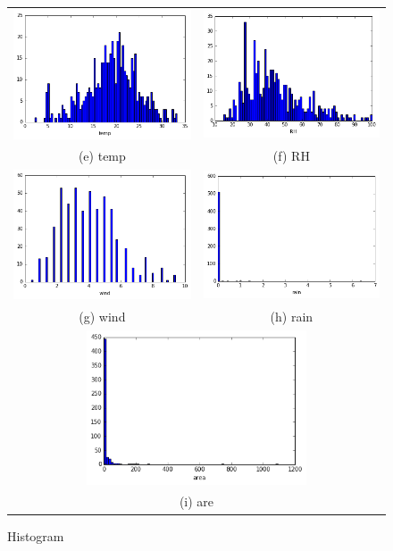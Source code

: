 \newpage

\begin{figure}
\begin{tabular}{cc}
  \includegraphics[width=65mm]{images/hist/temp.png} &   \includegraphics[width=65mm]{images/hist/RH.png} \\
(e) temp & (f) RH \\[6pt]
  \includegraphics[width=65mm]{images/hist/wind.png} &   \includegraphics[width=65mm]{images/hist/rain.png} \\
(g) wind & (h) rain \\[6pt]
\multicolumn{2}{c}{\includegraphics[width=65mm]{images/hist/area.png} }\\
\multicolumn{2}{c}{(i) are}
\end{tabular}
\caption{Histogram}
\end{figure}